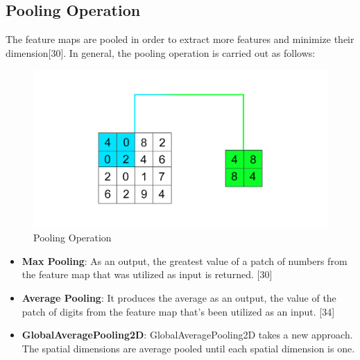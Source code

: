 \newpage
\subsection{Pooling Operation}

\vspace{5mm}
The feature maps are pooled in order to extract more features and minimize their dimension[30]. In general, the pooling operation is carried out as follows:
\vspace{5mm}
\begin{figure}[hbt!]
\centering
\includegraphics[scale=0.5]{images/pooling.png}
\caption{Pooling Operation}
\label{fig:x Pooling Operation}
\end{figure}
\vspace{5mm}
\begin{itemize}
    \item \textbf{Max Pooling}: As an output, the greatest value of a patch of numbers from the feature map that was utilized as input is returned. [30]
    \item \textbf{Average Pooling}: It produces the average as an output, the value of the patch of digits from the feature map that's been utilized as an input. [34]
    \item \textbf{GlobalAveragePooling2D}: GlobalAveragePooling2D takes a new approach. The spatial dimensions are average pooled until each spatial dimension is one.
\end{itemize}

